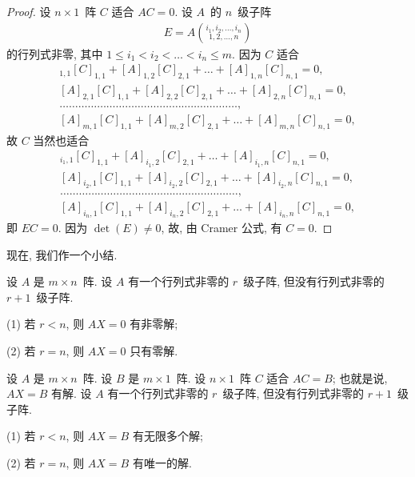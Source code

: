\begin{proof}
    设 \(n \times 1\)~阵 \(C\) 适合 \(AC = 0\).
    设 \(A\)~的 \(n\)~级子阵
    \begin{align*}
        E = A\binom{i_1,i_2,\dots,i_n}{1,2,\dots,n}
    \end{align*}
    的行列式非零,
    其中
    \(1 \leq i_1 < i_2 < \dots < i_n \leq m\).
    因为 \(C\) 适合
    \begin{align*}
        [A]_{1,1} [C]_{1,1} + [A]_{1,2} [C]_{2,1}
        + \dots + [A]_{1,n} [C]_{n,1} = 0, \\
        [A]_{2,1} [C]_{1,1} + [A]_{2,2} [C]_{2,1}
        + \dots + [A]_{2,n} [C]_{n,1} = 0, \\
        \dots \dots \dots
        \dots \dots \dots \dots
        \dots \dots \dots \dots
        \dots \dots \dots \dots
        \dots \dots \dots \dots,
        \\
        [A]_{m,1} [C]_{1,1} + [A]_{m,2} [C]_{2,1}
        + \dots + [A]_{m,n} [C]_{n,1} = 0,
    \end{align*}
    故 \(C\) 当然也适合
    \begin{align*}
        [A]_{i_1,1} [C]_{1,1} + [A]_{i_1,2} [C]_{2,1}
        + \dots + [A]_{i_1,n} [C]_{n,1} = 0, \\
        [A]_{i_2,1} [C]_{1,1} + [A]_{i_2,2} [C]_{2,1}
        + \dots + [A]_{i_2,n} [C]_{n,1} = 0, \\
        \dots \dots \dots
        \dots \dots \dots \dots
        \dots \dots \dots \dots
        \dots \dots \dots \dots
        \dots \dots \dots \dots,
        \\
        [A]_{i_n,1} [C]_{1,1} + [A]_{i_n,2} [C]_{2,1}
        + \dots + [A]_{i_n,n} [C]_{n,1} = 0,
    \end{align*}
    即 \(EC = 0\).
    因为 \(\det {(E)} \neq 0\),
    故, 由 Cramer 公式,
    有 \(C = 0\).
\end{proof}

现在, 我们作一个小结.

\begin{theorem}
    设 \(A\) 是 \(m \times n\)~阵.
    设 \(A\) 有一个行列式非零的 \(r\)~级子阵,
    但没有行列式非零的 \(r+1\)~级子阵.

    (1)
    若 \(r < n\),
    则 \(AX = 0\) 有非零解;

    (2)
    若 \(r = n\),
    则 \(AX = 0\) 只有零解.
\end{theorem}

\begin{theorem}
    设 \(A\) 是 \(m \times n\)~阵.
    设 \(B\) 是 \(m \times 1\)~阵.
    设 \(n \times 1\)~阵 \(C\) 适合 \(AC = B\);
    也就是说, \(AX = B\) 有解.
    设 \(A\) 有一个行列式非零的 \(r\)~级子阵,
    但没有行列式非零的 \(r+1\)~级子阵.

    (1)
    若 \(r < n\),
    则 \(AX = B\) 有无限多个解;

    (2)
    若 \(r = n\),
    则 \(AX = B\) 有唯一的解.
\end{theorem}

